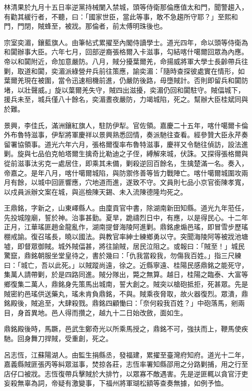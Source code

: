 \begin{pinyinscope}
林清果於九月十五日率逆黨持械闌入禁城，頭等侍衛那倫應值太和門，聞警趨入，有勸其緩行者，不聽，曰：「國家世臣，當此等事，敢不急趨所守耶？」至熙和門，門閉，賊蜂至，被戕。那倫者，前太傅明珠後也。

宗室奕湄，鑲藍旗人。由筆帖式累擢至內閣侍讀學士。道光四年，命以頭等侍衛為和闐辦事大臣。六年七月，回部逆裔張格爾入卡滋事，勾結喀什噶爾回眾為內應。帝以和闐附近，命加意嚴防。八月，賊分擾葉爾羌，命揚威將軍大學士長齡帶兵往剿，取道和闐，奕湄派綠營弁兵前往策應，諭奕湄：「隨時查探彼處實在情形，如葉爾羌現在被圍，當令迅速相機前進，仍嚴防後路，毋墮賊計。否則即留兵和闐防堵，以壯聲威。」旋以葉爾羌失守，賊四出滋擾，奕湄仍回和闐駐守。賊偪城下，援兵未至，城兵僅八十餘名，奕湄晝夜嚴防，力竭城陷，死之。幫辦大臣桂斌同與於難。

景興，李佳氏，滿洲鑲紅旗人，駐防伊犁。官佐領。嘉慶二十五年，喀什噶爾卡倫外布魯特滋事，伊犁將軍慶祥以景興熟悉回情，奏派馳往查看。經參贊大臣永芹奏留署協領事。道光六年六月，張格爾復率布魯特滋事，慶祥又令馳往偵訪，設法進剿。旋與七品伯克帕塔爾生擒奇比勒迪之子侄，縛解來城，伏誅。又探得張格爾與從前滋事汰劣克一處居住，即乘其未備，剿殺逆回百餘名，生擒楚滿一名。奏入，帝嘉之。是年八月，喀什噶爾城陷，與防禦佟善等皆力戰陣亡。喀什噶爾城圍攻兩月有餘，以城中回匪響應，穴地道而進，遂致不守。文員則七品小京官銜陳孝寬，以戍員派辦文案在城，與巡檢陳天錫、未入流陳德隆均死之。

王鼎銘，字新之，山東嶧縣人。由廩貢官中書，除湖南新田知縣。道光九年蒞任，先投城隍廟，誓於神。治事甚勤。夏旱，跪禱烈日中，有應，以是得民心。十二年正月，江華瑤匪趙金龍亂作，湖南提督海陵阿進剿。鼎銘慮煽邑瑤，即冒雪步歷瑤棚戒諭。復召瑤長，曉以國法。與教官率紳士練鄉勇以守。突聞海陵阿等被戕池塘墟，即督眾御賊。城外賊偪甚，將往諭賊，居民泣阻之。或報曰：「賊至！」城民驚竄，鼎銘朝服坐堂皇待之，書於幾曰：「仇我當殺我，勿傷我百姓。」指三尺練曰：「城亡，吾以此死。」以賊蹤尚遠，徐之。近縣寧遠、桂陽民感鼎銘之能死守，集萬人請帶剿，於是四路同進。賊分隊出，斃之無算。越日，桂陽之臨泰、大富等鄉復集二萬人，鼎銘身先策馬出城南，誓大創之。賊突以槍砲抵拒，死甚眾。先是賊密約邑瑤供送藥丸，瑤未肯負鼎銘，不與。賊乘夜脅取，故火器復烈。眾潰，鼎銘殿後，賊追至，大肆殺戮。鼎銘四顧慟曰：「奈何殺我百姓？」中砲落馬，剜兩目，身首異地。邑人得而攢之，越九十二日始改斂，面如生。

鼎銘殿後時，馬蹶，邑武生鄭奇光以所乘馬授之，鼎銘不可，強扶而上，鞭馬使疾馳。回身舞刀捍賊，受重創，死之。

呂志恆，江蘇陽湖人。由監生捐縣丞，發福建，累擢至臺灣府知府。道光十二年，嘉義縣賊匪張丙等糾眾滋事，焚掠各莊，志恆率署知縣邵用之分路剿捕，用之行至店仔口被戕。志恆復帶兵擊賊於大排竹，以眾寡不敵遇害。先是逆匪輒以貪官汙吏妄殺無辜為詞，帝疑有激變事，下福州將軍瑚松額等查奏無據，如例予恤。


\end{pinyinscope}
